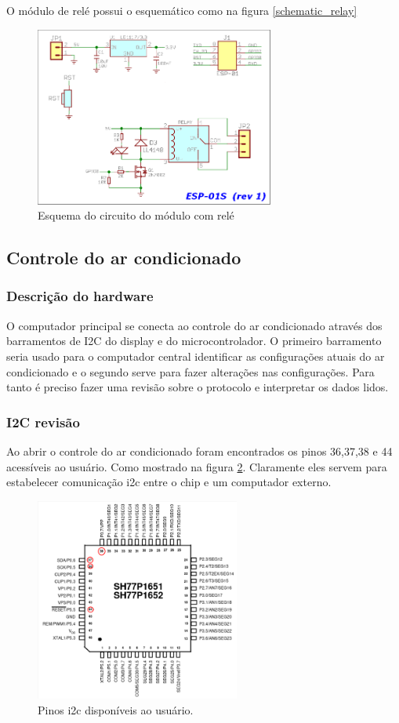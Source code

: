 \documentclass[11pt]{article}
\begin{document}
O módulo de relé possui o esquemático como na figura \ref{schematic_relay}
\begin{figure}[h!]
\caption{\label{fig:schematic_relay}Esquema do circuito do módulo com relé}
\centering
\includegraphics[width=0.7\textwidth]{./schematic_relay.png}
\end{figure}
\subsection{Controle do ar condicionado}
\label{sec:org1d87dce}
\subsubsection{Descrição do hardware}
\label{sec:org311741a}
O computador principal se conecta ao controle do ar condicionado através dos barramentos de I2C do display e do microcontrolador. O primeiro barramento seria usado para o computador central identificar as configurações atuais do ar condicionado e o segundo serve para fazer alterações nas configurações. Para tanto é preciso fazer uma revisão sobre o protocolo e interpretar os dados lidos.
\subsubsection{I2C revisão}
\label{sec:orgd01dc83}
Ao abrir o controle do ar condicionado foram encontrados os pinos 36,37,38 e 44 acessíveis ao usuário. Como mostrado na figura \ref{fig:i2c_sh77}. Claramente eles servem para estabelecer comunicação i2c entre o chip e um computador externo.
\begin{figure}[h!]
\caption{\label{fig:i2c_sh77}Pinos i2c disponíveis ao usuário.}
\centering
\includegraphics[width=0.6\textwidth]{./i2c_sh77.png}
\end{figure}
\end{document}
